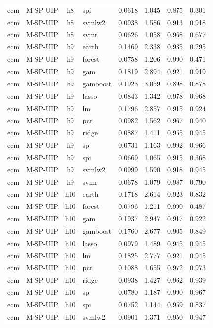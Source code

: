 \begin{ThreePartTable}
\begin{longtable}[t]{llclcccc}
ecm & M-SP-UIP & h8 & spi & 0.0618 & 1.045 & 0.875 & 0.301\\
ecm & M-SP-UIP & h8 & svmlw2 & 0.0938 & 1.586 & 0.913 & 0.918\\
ecm & M-SP-UIP & h8 & svmr & 0.0626 & 1.058 & 0.968 & 0.677\\
\addlinespace
ecm & M-SP-UIP & h9 & earth & 0.1469 & 2.338 & 0.935 & 0.295\\
ecm & M-SP-UIP & h9 & forest & 0.0758 & 1.206 & 0.990 & 0.471\\
ecm & M-SP-UIP & h9 & gam & 0.1819 & 2.894 & 0.921 & 0.919\\
ecm & M-SP-UIP & h9 & gamboost & 0.1923 & 3.059 & 0.898 & 0.878\\
ecm & M-SP-UIP & h9 & lasso & 0.0843 & 1.342 & 0.978 & 0.968\\
ecm & M-SP-UIP & h9 & lm & 0.1796 & 2.857 & 0.915 & 0.924\\
ecm & M-SP-UIP & h9 & pcr & 0.0982 & 1.562 & 0.967 & 0.940\\
ecm & M-SP-UIP & h9 & ridge & 0.0887 & 1.411 & 0.955 & 0.945\\
ecm & M-SP-UIP & h9 & sp & 0.0731 & 1.163 & 0.992 & 0.966\\
ecm & M-SP-UIP & h9 & spi & 0.0669 & 1.065 & 0.915 & 0.368\\
ecm & M-SP-UIP & h9 & svmlw2 & 0.0999 & 1.590 & 0.918 & 0.945\\
ecm & M-SP-UIP & h9 & svmr & 0.0678 & 1.079 & 0.987 & 0.790\\
\addlinespace
ecm & M-SP-UIP & h10 & earth & 0.1718 & 2.614 & 0.923 & 0.832\\
ecm & M-SP-UIP & h10 & forest & 0.0796 & 1.211 & 0.990 & 0.487\\
ecm & M-SP-UIP & h10 & gam & 0.1937 & 2.947 & 0.917 & 0.922\\
ecm & M-SP-UIP & h10 & gamboost & 0.1760 & 2.677 & 0.905 & 0.849\\
ecm & M-SP-UIP & h10 & lasso & 0.0979 & 1.489 & 0.945 & 0.945\\
ecm & M-SP-UIP & h10 & lm & 0.1825 & 2.777 & 0.921 & 0.945\\
ecm & M-SP-UIP & h10 & pcr & 0.1088 & 1.655 & 0.972 & 0.973\\
ecm & M-SP-UIP & h10 & ridge & 0.0938 & 1.427 & 0.962 & 0.939\\
ecm & M-SP-UIP & h10 & sp & 0.0780 & 1.187 & 0.990 & 0.967\\
ecm & M-SP-UIP & h10 & spi & 0.0752 & 1.144 & 0.959 & 0.837\\
ecm & M-SP-UIP & h10 & svmlw2 & 0.0901 & 1.371 & 0.950 & 0.947\\

\end{longtable}
\end{ThreePartTable}
